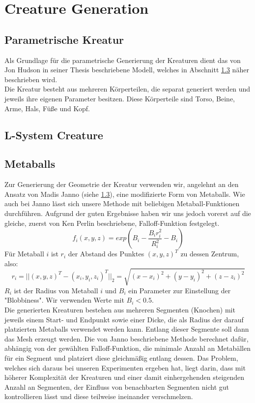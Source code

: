 \DeclarePairedDelimiter\norm{\lVert}{\rVert}

\section{Creature Generation}
\subsection{Parametrische Kreatur}
Als Grundlage für die parametrische Generierung der Kreaturen dient das von Jon Hudson in seiner Thesis \cite{Janno20182dCG} beschriebene Modell, welches in Abschnitt \ref{} näher beschrieben wird.\\

Die Kreatur besteht aus mehreren Körperteilen, die separat generiert werden und jeweils ihre eigenen Parameter besitzen. Diese Körperteile sind Torso, Beine, Arme, Hals, Füße und Kopf.



\subsection{L-System Creature}



\subsection{Metaballs}
Zur Generierung der Geometrie der Kreatur verwenden wir, angelehnt an den Ansatz von Madis Janno \cite{Hudson2013CreatureGU} (siehe \ref{}), eine modifizierte Form von Metaballs. Wie auch bei Janno lässt sich unsere Methode mit beliebigen Metaball-Funktionen durchführen. Aufgrund der guten Ergebnisse haben wir uns jedoch vorerst auf die gleiche, zuerst von Ken Perlin beschriebene, Falloff-Funktion festgelegt.
\[f_i(x,y,z) = exp(B_i - \frac{B_ir_i^2}{R_i^2} - B_i)\]
Für Metaball $i$ ist $r_i$ der Abstand des Punktes $(x,y,z)^T$ zu dessen Zentrum, also: \[r_i=||(x,y,z)^T-(x_i,y_i,z_i)^T||_2=\sqrt{(x-x_i)^2+(y-y_i)^2+(z-z_i)^2}\]
$R_i$ ist der Radius von Metaball $i$ und $B_i$ ein Parameter zur Einstellung der "Blobbiness". Wir verwenden Werte mit $B_i < 0.5$. \\
Die generierten Kreaturen bestehen aus mehreren Segmenten (Knochen) mit jeweils einem Start- und Endpunkt sowie einer Dicke, die als Radius der darauf platzierten Metaballs verwendet werden kann. Entlang dieser Segmente soll dann das Mesh erzeugt werden. Die von Janno beschriebene Methode berechnet dafür, abhängig von der gewählten Falloff-Funktion, die minimale Anzahl an Metabällen für ein Segment und platziert diese gleichmäßig entlang dessen. Das Problem, welches sich daraus bei unseren Experimenten ergeben hat, liegt darin, dass mit höherer Komplexität der Kreaturen und einer damit einhergehenden steigenden Anzahl an Segmenten, der Einfluss von benachbarten Segmenten nicht gut kontrollieren lässt und diese teilweise ineinander verschmelzen. \\


